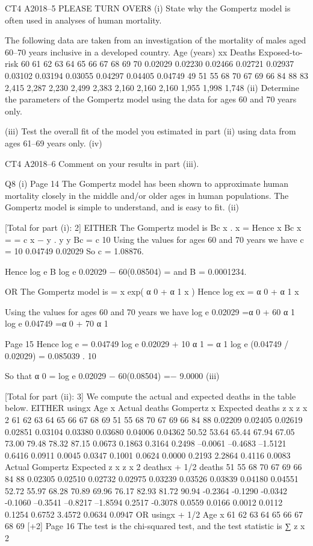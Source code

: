 \documentclass[a4paper,12pt]{article}
\begin{document}
CT4 A2018–5 
PLEASE TURN OVER8
(i)
State why the Gompertz model is often used in analyses of human mortality.

The following data are taken from an investigation of the mortality of males aged
60–70 years inclusive in a developed country.
Age (years) x\mu x Deaths Exposed-to-risk
60
61
62
63
64
65
66
67
68
69
70 0.02029
0.02230
0.02466
0.02721
0.02937
0.03102
0.03194
0.03055
0.04297
0.04405
0.04749 49
51
55
68
70
67
69
66
84
88
83 2,415
2,287
2,230
2,499
2,383
2,160
2,160
2,160
1,955
1,998
1,748
(ii) Determine the parameters of the Gompertz model using the data for ages 60
and 70 years only.

(iii) Test the overall fit of the model you estimated in part (ii) using data from
ages 61–69 years only.
(iv)

CT4 A2018–6
Comment on your results in part (iii).


Q8
(i)
Page 14
The Gompertz model has been shown to approximate human
mortality closely in the middle and/or older ages in human populations. 
The Gompertz model is simple to understand, 
and is easy to fit.
(ii)

[Total for part (i): 2]
EITHER
The Gompertz model is
Bc x .
\mu x =
Hence
\mu x Bc x
= =
c x − y .
y
\mu y Bc 
= c 10
Using the values for ages 60 and 70 years we have
c = 10
0.04749
0.02029
So c = 1.08876.

Hence
log e B log e 0.02029 − 60(0.08504)
=
and B = 0.0001234.

OR
The Gompertz model is
\mu
=
x exp( α 0 + α 1 x )
Hence
log e\mu x = α 0 + α 1 x

Using the values for ages 60 and 70 years we have
log e 0.02029 =α 0 + 60 α 1
log e 0.04749 =α 0 + 70 α 1

Page 15
Hence
log e =
0.04749 log e 0.02029 + 10 α 1
=
α 1
log e (0.04749 / 0.02029)
= 0.085039 .
10

So that
α 0 = log e 0.02029 − 60(0.08504) =− 9.0000
(iii)

[Total for part (ii): 3]
We compute the actual and expected deaths in the table below.
EITHER using\mu x
Age x Actual
deaths Gompertz
\mu x Expected
deaths z x z x 2
61
62
63
64
65
66
67
68
69 51
55
68
70
67
69
66
84
88 0.02209
0.02405
0.02619
0.02851
0.03104
0.03380
0.03680
0.04006
0.04362 50.52
53.64
65.44
67.94
67.05
73.00
79.48
78.32
87.15 0.0673
0.1863
0.3164
0.2498
–0.0061
–0.4683
–1.5121
0.6416
0.0911 0.0045
0.0347
0.1001
0.0624
0.0000
0.2193
2.2864
0.4116
0.0083
Actual Gompertz Expected z x z x 2
deaths\mu x + 1/2 deaths 51
55
68
70
67
69
66
84
88 0.02305
0.02510
0.02732
0.02975
0.03239
0.03526
0.03839
0.04180
0.04551 52.72
55.97
68.28
70.89
69.96
76.17
82.93
81.72
90.94 -0.2364
-0.1290
-0.0342
-0.1060
–0.3541
–0.8217
–1.8594
0.2517
-0.3078 0.0559
0.0166
0.0012
0.0112
0.1254
0.6752
3.4572
0.0634
0.0947
OR using\mu x + 1/2
Age x
61
62
63
64
65
66
67
68
69
[+2]
Page 16
The test is the chi-squared test, and the test statistic is
∑ z x
2
\end{document}
